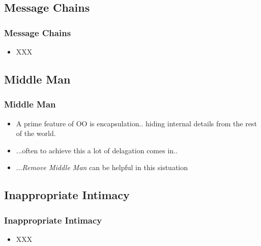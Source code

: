 \documentclass{beamer}
\begin{document}
\subsection{Message Chains}
\begin{frame}
  \frametitle{Message Chains}
  \begin{itemize}
	\item<+-> XXX
  \end{itemize}
\end{frame}

\subsection{Middle Man}
\begin{frame}
  \frametitle{Middle Man}
  \begin{itemize}
	\item<+-> A prime feature of OO is encapsulation.. hiding internal details from the rest of the world.
	\item<+-> ...often to achieve this a lot of delagation comes in..
	\item<+-> ...\textit{Remove Middle Man} can be helpful in this sistuation
   \end{itemize}
\end{frame}

\subsection{Inappropriate Intimacy}
\begin{frame}
  \frametitle{Inappropriate Intimacy}
  \begin{itemize}
	\item<+-> XXX 
   \end{itemize}
\end{frame}
\end{document}
